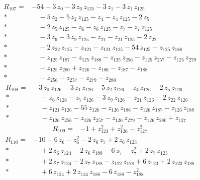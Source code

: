 \documentclass[10pt]{article}
\begin{document}
\begin{align*}
R_{107}={}& - 54 - 3\,z_{0} - 3\,z_{0}\,z_{125} - 3\,z_{1} - 3\,z_{1}\,z_{125} \\*
&\quad - 5\,z_{2} - 5\,z_{2}\,z_{125} - z_{4} - z_{4}\,z_{125} - 2\,z_{5} \\*
&\quad - 2\,z_{5}\,z_{125} - z_{6} - z_{6}\,z_{125} - z_{7} - z_{7}\,z_{125} \\*
&\quad - 3\,z_{9} - 3\,z_{9}\,z_{125} - z_{21} - z_{21}\,z_{125} - 2\,z_{22} \\*
&\quad - 2\,z_{22}\,z_{125} - z_{121} - z_{121}\,z_{125} - 54\,z_{125} - z_{125}\,z_{186} \\*
&\quad - z_{125}\,z_{187} - z_{125}\,z_{188} - z_{125}\,z_{256} - z_{125}\,z_{257} - z_{125}\,z_{279} \\*
&\quad - z_{125}\,z_{280} + z_{126} - z_{186} - z_{187} - z_{188} \\*
&\quad - z_{256} - z_{257} - z_{279} - z_{280}
\end{align*}
\begin{align*}
R_{108}={}& - 3\,z_{0}\,z_{126} - 3\,z_{1}\,z_{126} - 5\,z_{2}\,z_{126} - z_{4}\,z_{126} - 2\,z_{5}\,z_{126} \\*
&\quad - z_{6}\,z_{126} - z_{7}\,z_{126} - 3\,z_{9}\,z_{126} - z_{21}\,z_{126} - 2\,z_{22}\,z_{126} \\*
&\quad - z_{121}\,z_{126} - 55\,z_{126} - z_{126}\,z_{186} - z_{126}\,z_{187} - z_{126}\,z_{188} \\*
&\quad - z_{126}\,z_{256} - z_{126}\,z_{257} - z_{126}\,z_{279} - z_{126}\,z_{280} + z_{127}
\end{align*}
\begin{align*}
R_{109}={}& - 1 + z_{123}^{2} + z_{126}^{2} - z_{127}^{2}
\end{align*}
\begin{align*}
R_{110}={}& - 10 - 6\,z_{6} - z_{6}^{2} - 2\,z_{6}\,z_{7} + 2\,z_{6}\,z_{123} \\*
&\quad + 2\,z_{6}\,z_{124} - 2\,z_{6}\,z_{188} - 6\,z_{7} - z_{7}^{2} + 2\,z_{7}\,z_{123} \\*
&\quad + 2\,z_{7}\,z_{124} - 2\,z_{7}\,z_{188} - z_{122}\,z_{128} + 6\,z_{123} + 2\,z_{123}\,z_{188} \\*
&\quad + 6\,z_{124} + 2\,z_{124}\,z_{188} - 6\,z_{188} - z_{188}^{2}
\end{align*}
\end{document}
